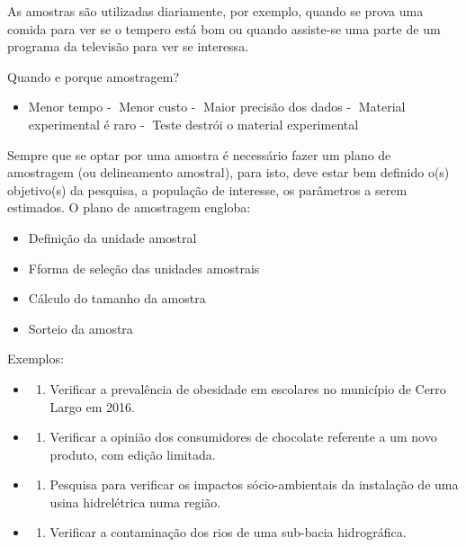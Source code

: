 \documentclass[12pt,brazil,oneside]{book}
\providecommand{\tightlist}{%
  \setlength{\itemsep}{0pt}\setlength{\parskip}{0pt}}
\begin{document}
As amostras são utilizadas diariamente, por exemplo, quando se prova uma comida para ver se o tempero está bom ou quando assiste-se uma parte de um programa da televisão para ver se interessa.

Quando e porque amostragem?

\begin{itemize}
\tightlist
\item
  Menor tempo
  - Menor custo
  - Maior precisão dos dados
  - Material experimental é raro
  - Teste destrói o material experimental
\end{itemize}

Sempre que se optar por uma amostra é necessário fazer um plano de amostragem (ou delineamento amostral), para isto, deve estar bem definido o(s) objetivo(s) da pesquisa, a população de interesse, os parâmetros a serem estimados. O plano de amostragem engloba:

\begin{itemize}
\tightlist
\item
  Definição da unidade amostral
\item
  Fforma de seleção das unidades amostrais
\item
  Cálculo do tamanho da amostra
\item
  Sorteio da amostra
\end{itemize}

Exemplos:

\begin{itemize}
\item
  \begin{enumerate}
  \def\labelenumi{\arabic{enumi}.}
  \tightlist
  \item
    Verificar a prevalência de obesidade em escolares no município de Cerro Largo em 2016.
  \end{enumerate}
\item
  \begin{enumerate}
  \def\labelenumi{\arabic{enumi}.}
  \setcounter{enumi}{1}
  \tightlist
  \item
    Verificar a opinião dos consumidores de chocolate referente a um novo produto, com edição limitada.
  \end{enumerate}
\item
  \begin{enumerate}
  \def\labelenumi{\arabic{enumi}.}
  \setcounter{enumi}{2}
  \tightlist
  \item
    Pesquisa para verificar os impactos sócio-ambientais da instalação de uma usina hidrelétrica numa região.
  \end{enumerate}
\item
  \begin{enumerate}
  \def\labelenumi{\arabic{enumi}.}
  \setcounter{enumi}{3}
  \tightlist
  \item
    Verificar a contaminação dos rios de uma sub-bacia hidrográfica.
  \end{enumerate}
\end{itemize}
\end{document}
